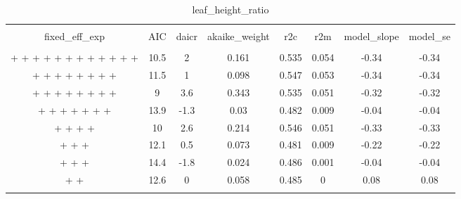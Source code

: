 
\begin{table}[!htbp] \centering 
  \caption{leaf_height_ratio} 
  \label{leaf_height_ratio} 
\begin{tabular}{@{\extracolsep{5pt}} cccccccc} 
\\[-1.8ex]\hline 
\hline \\[-1.8ex] 
fixed\_eff\_exp & AIC & daicr & akaike\_weight & r2c & r2m & model\_slope & model\_se \\ 
\hline \\[-1.8ex] 
 +  +  +  +  +  +  +  +  +  +  +  +  & 10.5 & 2 & 0.161 & 0.535 & 0.054 & -0.34 & -0.34 \\ 
 +  +  +  +  +  +  +  +  & 11.5 & 1 & 0.098 & 0.547 & 0.053 & -0.34 & -0.34 \\ 
 +  +  +  +  +  +  +  +  & 9 & 3.6 & 0.343 & 0.535 & 0.051 & -0.32 & -0.32 \\ 
 +  +  +  +  +  +  +  & 13.9 & -1.3 & 0.03 & 0.482 & 0.009 & -0.04 & -0.04 \\ 
 +  +  +  +  & 10 & 2.6 & 0.214 & 0.546 & 0.051 & -0.33 & -0.33 \\ 
 +  +  +  & 12.1 & 0.5 & 0.073 & 0.481 & 0.009 & -0.22 & -0.22 \\ 
 +  +  +  & 14.4 & -1.8 & 0.024 & 0.486 & 0.001 & -0.04 & -0.04 \\ 
 +  +  & 12.6 & 0 & 0.058 & 0.485 & 0 & 0.08 & 0.08 \\ 
\hline \\[-1.8ex] 
\end{tabular} 
\end{table} 

